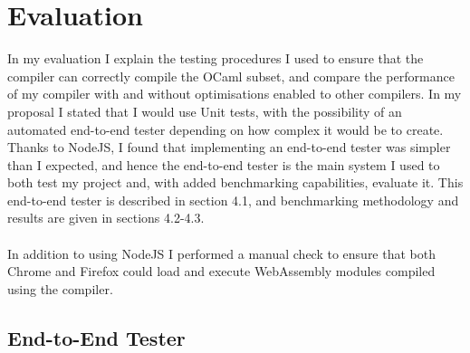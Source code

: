 \chapter{Evaluation}




In my evaluation I explain the testing procedures I used to ensure that the compiler can correctly compile the OCaml subset, and compare the performance of my compiler with and without optimisations enabled to other compilers. In my proposal I stated that I would use Unit tests, with the possibility of an automated end-to-end tester depending on how complex it would be to create. Thanks to NodeJS, I found that implementing an end-to-end tester was simpler than I expected, and hence the end-to-end tester is the main system I used to both test my project and, with added benchmarking capabilities, evaluate it. This end-to-end tester is described in section 4.1, and benchmarking methodology and results are given in sections 4.2-4.3.
\\\\
In addition to using NodeJS I performed a manual check to ensure that both Chrome and Firefox could load and execute WebAssembly modules compiled using the compiler.

\section{End-to-End Tester}

